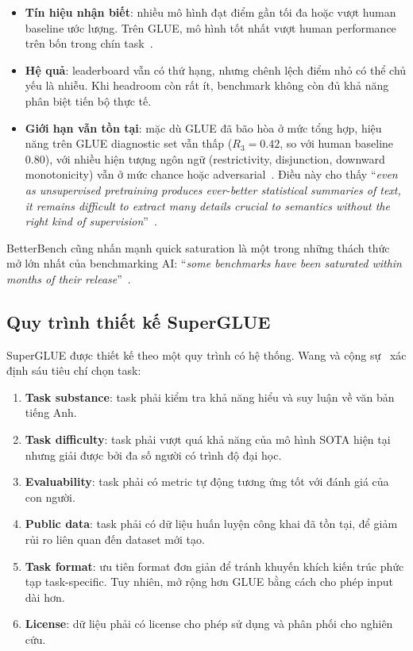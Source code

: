 \begin{itemize}
    \item \textbf{Tín hiệu nhận biết}: nhiều mô hình đạt điểm gần tối đa hoặc vượt human baseline ước lượng. Trên GLUE, mô hình tốt nhất vượt human performance trên bốn trong chín task~\cite{superglue}.
    \item \textbf{Hệ quả}: leaderboard vẫn có thứ hạng, nhưng chênh lệch điểm nhỏ có thể chủ yếu là nhiễu. Khi headroom còn rất ít, benchmark không còn đủ khả năng phân biệt tiến bộ thực tế.
    \item \textbf{Giới hạn vẫn tồn tại}: mặc dù GLUE đã bão hòa ở mức tổng hợp, hiệu năng trên GLUE diagnostic set vẫn thấp ($R_3 = 0.42$, so với human baseline 0.80), với nhiều hiện tượng ngôn ngữ (restrictivity, disjunction, downward monotonicity) vẫn ở mức chance hoặc adversarial~\cite{superglue}. Điều này cho thấy ``\textit{even as unsupervised pretraining produces ever-better statistical summaries of text, it remains difficult to extract many details crucial to semantics without the right kind of supervision}''~\cite{superglue}.
\end{itemize}

BetterBench cũng nhấn mạnh quick saturation là một trong những thách thức mở lớn nhất của benchmarking AI: ``\textit{some benchmarks have been saturated within months of their release}''~\cite{betterbench}.

\subsection{Quy trình thiết kế SuperGLUE}

SuperGLUE được thiết kế theo một quy trình có hệ thống. Wang và cộng sự~\cite{superglue} xác định sáu tiêu chí chọn task:

\begin{enumerate}
    \item \textbf{Task substance}: task phải kiểm tra khả năng hiểu và suy luận về văn bản tiếng Anh.
    \item \textbf{Task difficulty}: task phải vượt quá khả năng của mô hình SOTA hiện tại nhưng giải được bởi đa số người có trình độ đại học.
    \item \textbf{Evaluability}: task phải có metric tự động tương ứng tốt với đánh giá của con người.
    \item \textbf{Public data}: task phải có dữ liệu huấn luyện công khai đã tồn tại, để giảm rủi ro liên quan đến dataset mới tạo.
    \item \textbf{Task format}: ưu tiên format đơn giản để tránh khuyến khích kiến trúc phức tạp task-specific. Tuy nhiên, mở rộng hơn GLUE bằng cách cho phép input dài hơn.
    \item \textbf{License}: dữ liệu phải có license cho phép sử dụng và phân phối cho nghiên cứu.
\end{enumerate}

